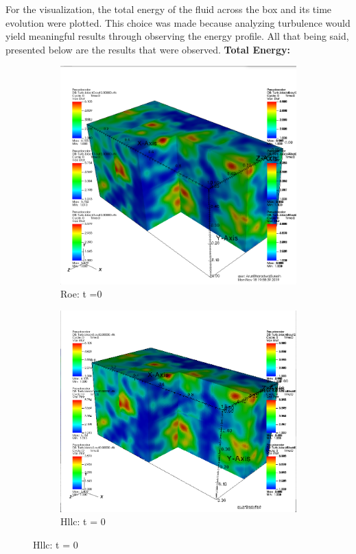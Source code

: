 \documentclass[12pt]{article}
\begin{document}
For the visualization, the total energy of the fluid across the box and its time evolution were plotted. This choice was made because analyzing turbulence would yield meaningful results through observing the energy profile. All that being said, presented below are the results that were observed. \newpage \noindent \textbf{Total Energy:}\\
\begin{figure}[h]
	\centering
	\begin{subfigure}[h]{0.4500\textwidth}
		\centering
		\includegraphics[width=\textwidth]{roet0.png}
		\caption{Roe: t =0}
	\end{subfigure}
	\begin{subfigure}[h]{0.4500\textwidth}
		\centering
		\includegraphics[width=\textwidth]{hllct0.png}
		\caption{Hllc: t = 0}
	\end{subfigure}
\end{figure}\\\\
\end{document}

